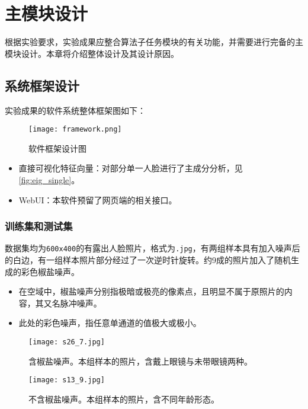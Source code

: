 \chapter{主模块设计}
\label{cha:fr}
根据实验要求，实验成果应整合算法子任务模块的有关功能，并需要进行完备的主模块设计。本章将介绍整体设计及其设计原因。

\section{系统框架设计}

实验成果的软件系统整体框架图如下：

\begin{figure}[H]
    \centering
    \texttt{[image: framework.png]}
    \caption{软件框架设计图}
    \label{fig:framework}
\end{figure}

\begin{itemize}
    \item 直接可视化特征向量：对部分单一人脸进行了主成分分析，见\autoref{fig:eig_single}。
    \item WebUI：本软件预留了网页端的相关接口。
\end{itemize}

\subsection{训练集和测试集}
\label{sec:dataset}

数据集均为\verb|600x400|的有露出人脸照片，格式为\verb|.jpg|，有两组样本具有加入噪声后的白边，有一组样本照片部分经过了一次逆时针旋转。约9成的照片加入了随机生成的彩色椒盐噪声。
\begin{itemize}
    \item 在空域中，椒盐噪声分别指极暗或极亮的像素点，且明显不属于原照片的内容，其又名脉冲噪声。
    \item 此处的彩色噪声，指任意单通道的值极大或极小。
\end{itemize}

\begin{figure}[H]
	\begin{minipage}{0.45\textwidth}
		\centering
		\texttt{[image: s26\_7.jpg]}
		\caption{含椒盐噪声。本组样本的照片，含戴上眼镜与未带眼镜两种。}
	\end{minipage}\hfill
	\begin{minipage}{0.45\textwidth}
		\centering
		\texttt{[image: s13\_9.jpg]}
		\caption{不含椒盐噪声。本组样本的照片，含不同年龄形态。}
	\end{minipage}
\end{figure}

